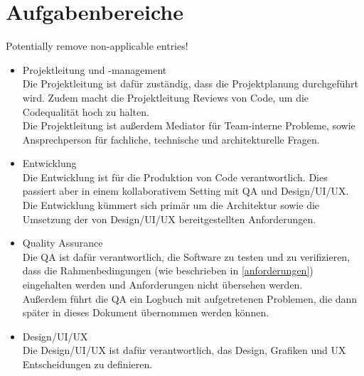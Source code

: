 \section{Aufgabenbereiche}
\label{aufgabenbereiche}

{\color{red} Potentially remove non-applicable entries!}

\begin{itemize}
	\item Projektleitung und -management\\
	Die Projektleitung ist dafür zuständig, dass die Projektplanung durchgeführt wird. Zudem macht die Projektleitung Reviews von Code, um die Codequalität hoch zu halten.\\
	Die Projektleitung ist außerdem Mediator für Team-interne Probleme, sowie Ansprechperson für fachliche, technische und architekturelle Fragen.
	
	\item Entwicklung\\
	Die Entwicklung ist für die Produktion von Code verantwortlich. Dies passiert aber in einem kollaborativem Setting mit QA und Design/UI/UX.\\
	Die Entwicklung kümmert sich primär um die Architektur sowie die Umsetzung der von Design/UI/UX bereitgestellten Anforderungen.
	
	\item Quality Assurance\\
	Die QA ist dafür verantwortlich, die Software zu testen und zu verifizieren, dass die Rahmenbedingungen (wie beschrieben in \autoref{anforderungen}) eingehalten werden und Anforderungen nicht übersehen werden.\\
	Außerdem führt die QA ein Logbuch mit aufgetretenen Problemen, die dann später in dieses Dokument übernommen werden können.
	
	\item Design/UI/UX\\
	Die Design/UI/UX ist dafür verantwortlich, das Design, Grafiken und UX Entscheidungen zu definieren.\\
\end{itemize}